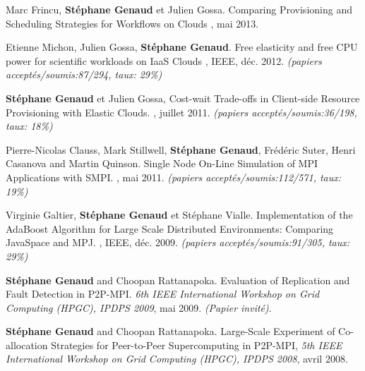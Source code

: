 \begin{thebibliography}{99}
Marc Frincu, \textbf{Stéphane Genaud} et Julien Gossa.
\newblock Comparing Provisioning and Scheduling Strategies for Workflows on Clouds
, mai 2013.

Etienne Michon, Julien Gossa, \textbf{Stéphane Genaud}.
\newblock Free elasticity and free CPU power for scientific workloads on IaaS Clouds
, 
IEEE, déc. 2012.
\newblock \small{\textit{(papiers acceptés/soumis:87/294, taux: 29\%)}}


\newblock \textbf{Stéphane Genaud} et Julien Gossa,
\newblock Cost-wait Trade-offs in Client-side Resource Provisioning with 
Elastic Clouds.
, juillet 2011.
\newblock \small{\textit{(papiers acceptés/soumis{:}36/198, taux: 18\%)}}


\newblock Pierre-Nicolas Clauss, Mark Stillwell, \textbf{Stéphane Genaud}, 
Fr\'ed\'eric Suter, Henri Casanova and  Martin Quinson.
\newblock Single Node On-Line Simulation of MPI Applications with SMPI.
, mai 2011.
\newblock \small{\textit{(papiers acceptés/soumis{:}112/571, taux: 19\%)}}

\newblock Virginie Galtier, \textbf{Stéphane Genaud} et Stéphane Vialle.
\newblock Implementation of the AdaBoost Algorithm for Large Scale Distributed 
Environments: Comparing JavaSpace and MPJ.
, 
IEEE, déc. 2009.
\newblock \small{\textit{(papiers acceptés/soumis:91/305, taux: 29\%)}}


\textbf{Stéphane Genaud} and Choopan Rattanapoka.
\newblock Evaluation of Replication and Fault Detection in P2P-MPI.
\newblock 
{\em 6th IEEE International Workshop on Grid Computing (HPGC), IPDPS 2009}, 
mai 2009.
\newblock \textit{(Papier invité)}.

\textbf{Stéphane Genaud} and Choopan Rattanapoka. 
\newblock Large-Scale Experiment of Co-allocation Strategies for Peer-to-Peer 
Supercomputing in P2P-MPI,
\newblock 
{\em 5th IEEE International Workshop on Grid Computing (HPGC), IPDPS 2008}, 
avril 2008.


\end{thebibliography}
